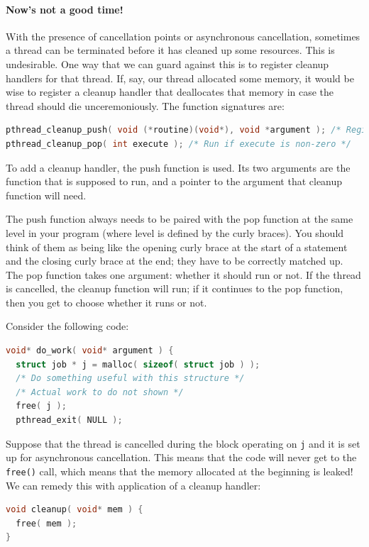 \documentclass[a4paper]{report}
\begin{document}
\begin{appendices}
\paragraph{Now's not a good time!} With the presence of cancellation points or asynchronous cancellation, sometimes a thread can be terminated before it has cleaned up some resources. This is undesirable. One way that we can guard against this is to register cleanup handlers for that thread. If, say, our thread allocated some memory, it would be wise to register a cleanup handler that deallocates that memory in case the thread should die unceremoniously. The function signatures are:

\begin{lstlisting}[language=C]
pthread_cleanup_push( void (*routine)(void*), void *argument ); /* Register cleanup handler, with argument */ 
pthread_cleanup_pop( int execute ); /* Run if execute is non-zero */ 
\end{lstlisting}

To add a cleanup handler, the push function is used. Its two arguments are the function that is supposed to run, and a pointer to the argument that cleanup function will need.

The push function always needs to be paired with the pop function at the same level in your program (where level is defined by the curly braces). You should think of them as being like the opening curly brace at the start of a statement and the closing curly brace at the end; they have to be correctly matched up. The pop function takes one argument: whether it should run or not. If the thread is cancelled, the cleanup function will run; if it continues to the pop function, then you get to choose whether it runs or not.

Consider the following code: 
\begin{lstlisting}[language=C]
void* do_work( void* argument ) {
  struct job * j = malloc( sizeof( struct job ) );
  /* Do something useful with this structure */
  /* Actual work to do not shown */
  free( j );
  pthread_exit( NULL );
\end{lstlisting}

Suppose that the thread is cancelled during the block operating on \texttt{j} and it is set up for asynchronous cancellation. This means that the code will never get to the \texttt{free()} call, which means that the memory allocated at the beginning is leaked! We can remedy this with application of a cleanup handler:
\begin{lstlisting}[language=C]
void cleanup( void* mem ) {
  free( mem );
}


\end{lstlisting}
\end{appendices}
\end{document}
